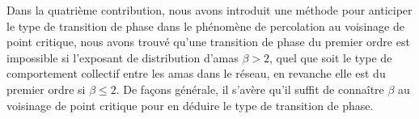 Dans la quatrième contribution, nous avons introduit une méthode pour anticiper  le type de transition de phase dans le phénomène de percolation au voisinage de point critique, nous avons trouvé qu'une transition de phase du premier ordre est impossible si l'exposant de distribution d'amas $\beta>2$, quel que soit le type de comportement collectif entre les amas  dans le réseau, en revanche elle est du premier ordre si $\beta\leq2$. De façons générale, il s'avère qu'il suffit de connaître $\beta$ au voisinage de point critique pour en déduire le type de transition de phase.